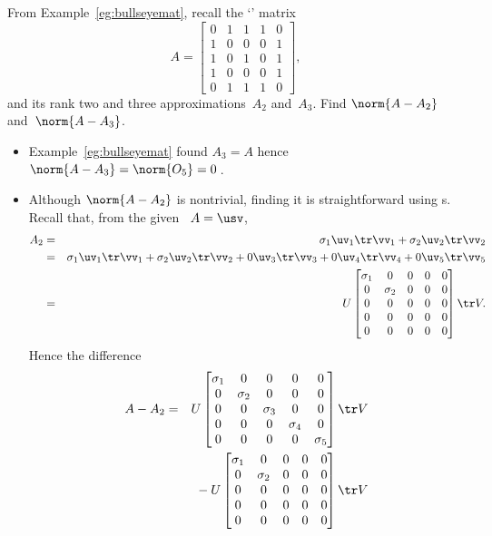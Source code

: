 \begin{example} \label{eg:}
From Example~\ref{eg:bullseyemat}, recall the `' matrix
\begin{equation*}
A=\begin{bmatrix} 0&1&1&1&0
\\1&0&0&0&1
\\1&0&1&0&1
\\1&0&0&0&1
\\0&1&1&1&0 \end{bmatrix},
\end{equation*}
and its rank two and three approximations~\(A_2\) and~\(A_3\).
Find \(\norm{A-A_2}\) and~\(\norm{A-A_3}\).
\begin{solution} 
\begin{itemize}
\item Example~\ref{eg:bullseyemat} found \(A_3=A\) hence \(\norm{A-A_3}=\norm{O_5}=0\)\,.
\item Although \(\norm{A-A_2}\) is nontrivial, finding it is straightforward using \svd{}s.
Recall that, from the given \svd\ \(A=\usv\),
\begin{eqnarray*}
A_2&=&\sigma_1\uv_1\tr\vv_1+\sigma_2\uv_2\tr\vv_2
\\&=&\sigma_1\uv_1\tr\vv_1+\sigma_2\uv_2\tr\vv_2+0\uv_3\tr\vv_3+0\uv_4\tr\vv_4+0\uv_5\tr\vv_5
\\&=&U\begin{bmatrix} \sigma_1&0&0&0&0
\\0&\sigma_2&0&0&0
\\0&0&0&0&0
\\0&0&0&0&0
\\0&0&0&0&0 \end{bmatrix}\tr V.
\end{eqnarray*}
Hence the difference
\begin{eqnarray*}
A-A_2&=&U\begin{bmatrix} \sigma_1&0&0&0&0
\\0&\sigma_2&0&0&0
\\0&0&\sigma_3&0&0
\\0&0&0&\sigma_4&0
\\0&0&0&0&\sigma_5 \end{bmatrix}\tr V
\\&&{}
-U\begin{bmatrix} \sigma_1&0&0&0&0
\\0&\sigma_2&0&0&0
\\0&0&0&0&0
\\0&0&0&0&0
\\0&0&0&0&0 \end{bmatrix}\tr V

\end{eqnarray*}
\end{itemize}
\end{solution}
\end{example}
